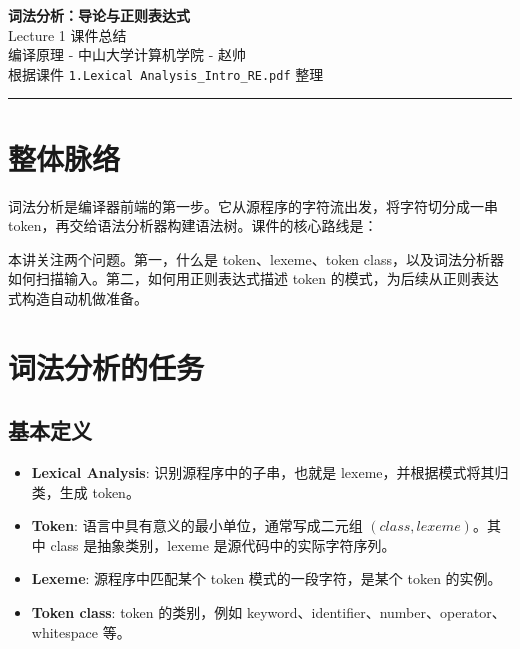 \documentclass[11pt,a4paper]{article}
\newcommand{\code}[1]{\texttt{#1}}
\begin{document}
\begin{center}
  {\Huge\bfseries 词法分析：导论与正则表达式}\\[0.6em]
  {\Large Lecture 1 课件总结}\\[0.8em]
  {\large 编译原理 - 中山大学计算机学院 - 赵帅}\\[0.5em]
  {\normalsize 根据课件 \code{1.Lexical Analysis\_Intro\_RE.pdf} 整理}
\end{center}

\vspace{0.6em}
\hrule
\vspace{1em}

\section{整体脉络}

词法分析是编译器前端的第一步。它从源程序的字符流出发，将字符切分成一串 token，再交给语法分析器构建语法树。课件的核心路线是：

\begin{center}
\end{center}

本讲关注两个问题。第一，什么是 token、lexeme、token class，以及词法分析器如何扫描输入。第二，如何用正则表达式描述 token 的模式，为后续从正则表达式构造自动机做准备。

\section{词法分析的任务}

\subsection{基本定义}

\begin{itemize}
  \item \textbf{Lexical Analysis}: 识别源程序中的子串，也就是 lexeme，并根据模式将其归类，生成 token。
  \item \textbf{Token}: 语言中具有意义的最小单位，通常写成二元组 $(class, lexeme)$。其中 class 是抽象类别，lexeme 是源代码中的实际字符序列。
  \item \textbf{Lexeme}: 源程序中匹配某个 token 模式的一段字符，是某个 token 的实例。
  \item \textbf{Token class}: token 的类别，例如 keyword、identifier、number、operator、whitespace 等。
\end{itemize}
\end{document}
